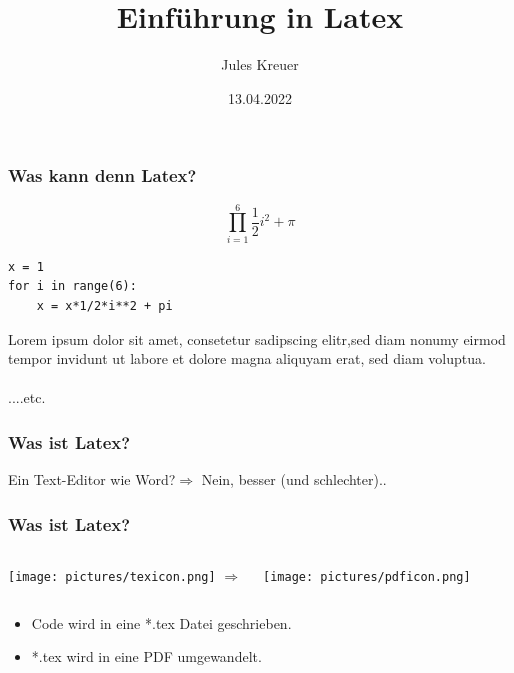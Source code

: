 \documentclass{beamer}
\title[]{Einführung in Latex} %
\author{Jules Kreuer} %
\institute[FSI] %
{
FSI Uni Tübingen\\
angelehnt auf den Workshop von Adreas Rist 2019\\
\medskip
\textit{fsi@fsi.uni-tuebingen.de}\\
}
\date{13.04.2022} %
\begin{document}
\begin{frame}
\titlepage %
\end{frame}





\begin{frame}[fragile]
\frametitle{Was kann denn Latex?}
\[
\prod^6_{i=1} \frac{1}{2}i^2 + \pi
\]
\begin{verbatim}
x = 1
for i in range(6):
	x = x*1/2*i**2 + pi
\end{verbatim}
Lorem ipsum dolor sit amet, consetetur sadipscing elitr,sed diam nonumy eirmod tempor invidunt ut labore et dolore magna aliquyam erat, sed diam voluptua.\\\\
....etc.
\end{frame}

\begin{frame}
\frametitle{Was ist Latex?}
    Ein Text-Editor wie Word?\pause $\Rightarrow$ Nein, besser (und schlechter)..

\end{frame}


\begin{frame}
     \frametitle{Was ist Latex?}
     \begin{columns}[c] %

     \texttt{[image: pictures/texicon.png]}
     \Huge{$ \Rightarrow $}

     \texttt{[image: pictures/pdficon.png]}

     \end{columns}
\begin{itemize}[<+->]
     \item Code wird in eine *.tex Datei geschrieben.
     \item *.tex wird in eine PDF umgewandelt.
\end{itemize}
\end{frame}
\end{document}
